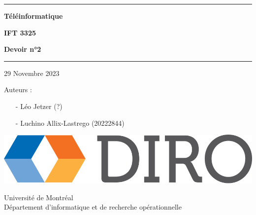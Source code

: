 \documentclass{article}
\begin{document}
\begin{titlepage}

	\begin{center}
		\hrule

		\vspace{.5cm}

		\Huge
		\textbf{Téléinformatique}

		\vspace{.3cm}
		\LARGE

		\textbf{IFT 3325}
		\vspace{.3cm}

		\textbf{Devoir n°2}
		\vspace{.3cm}

		\hrule

		\vspace{1cm}

		29 Novembre 2023 \\
	\end{center}

	\vspace{2cm}

	\LARGE

	\noindent Auteurs :

	\begin{enumerate}
		\item[-] Léo Jetzer (?)
		\item[-] Luchino Allix-Lastrego (20222844)   
	\end{enumerate}


			
	\vfill


	\begin{center}

		\includegraphics[scale=.1]{diro.png}

		\vspace{0.8cm}

		Université de Montréal\\
		Département d'informatique et de recherche opérationnelle\\

	\end{center}
	
\end{titlepage}
\end{document}

